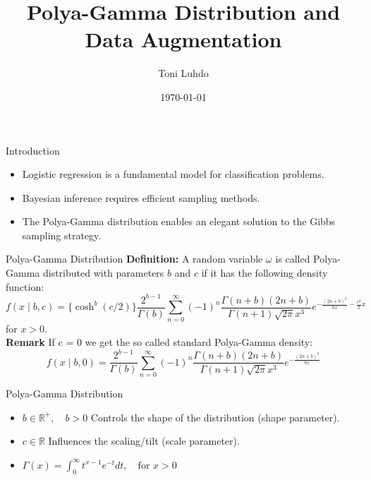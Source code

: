 \documentclass{beamer}
\title{Polya-Gamma Distribution and Data Augmentation}
\author{Toni Luhdo}
\date{\today}
\begin{document}
	
	\frame{\titlepage}
	
	\begin{frame}{Introduction}
		\begin{itemize}
			\item Logistic regression is a fundamental model for classification problems.
			\item Bayesian inference requires efficient sampling methods.
			\item The Polya-Gamma distribution enables an elegant solution to the Gibbs sampling strategy.
		\end{itemize}
	\end{frame}
	
	
	\begin{frame}{Polya-Gamma Distribution}
			\textbf{Definition:} A random variable $\omega$ is called Polya-Gamma distributed with parameters \( b \) and \( c \) if it has the following density function:
			\begin{equation}
			f(x \mid b, c) = \{\cosh^b(c/2)\} \frac{2^{b-1}}{\Gamma(b)}
			\sum_{n=0}^{\infty} (-1)^n 
			\frac{\Gamma(n + b) (2n + b)}{\Gamma(n + 1) \sqrt{2\pi} x^3} 
			e^{- \frac{(2n+b)^2}{8x} - \frac{c^2}{2}x}
		\end{equation}
		for $x > 0$.\\
		\textbf{Remark}
		If c = 0 we get the so called standard Polya-Gamma density:
			\begin{equation}
			f(x \mid b, 0) = \frac{2^{b-1}}{\Gamma(b)}
			\sum_{n=0}^{\infty} (-1)^n 
			\frac{\Gamma(n + b) (2n + b)}{\Gamma(n + 1) \sqrt{2\pi} x^3} 
			e^{- \frac{(2n+b)^2}{8x}}
		\end{equation}
	\end{frame}
	
	\begin{frame}{Polya-Gamma Distribution}
		
		\begin{itemize}
			\item \( b \in \mathbb{R}^{+}, \quad b > 0 \) Controls the shape of the distribution (shape parameter).
			\item \( c \in \mathbb{R}\) Influences the scaling/tilt (scale parameter).
			\item \( \Gamma(x) = \int_0^\infty t^{x-1} e^{-t} dt, \quad \text{for } x > 0 \)
		\end{itemize}
	\end{frame}
	
\end{document}
